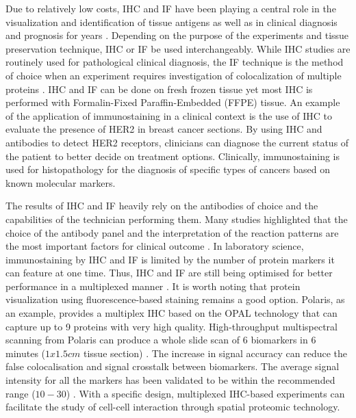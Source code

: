 Due to relatively low costs, IHC and IF have been playing a central role in the visualization and identification of tissue antigens as well as in clinical diagnosis and prognosis for years \cite{ducheyne2015comprehensive, rupprecht2015current}. Depending on the purpose of the experiments and tissue preservation technique, IHC or IF be used interchangeably. While IHC studies are routinely used for pathological clinical diagnosis, the IF technique is the method of choice when an experiment requires investigation of colocalization of multiple proteins \cite{joshi2017immunofluorescence}. IHC and IF can be done on fresh frozen tissue yet most IHC is performed with Formalin-Fixed Paraffin-Embedded (FFPE) tissue. An example of the application of immunostaining in a clinical context is the use of IHC to evaluate the presence of HER2 in breast cancer sections. By using IHC and antibodies to detect HER2 receptors, clinicians can diagnose the current status of the patient to better decide on treatment options. Clinically, immunostaining is used for histopathology for the diagnosis of specific types of cancers based on known molecular markers.  

The results of IHC and IF heavily rely on the antibodies of choice and the capabilities of the technician performing them. Many studies highlighted that the choice of the antibody panel and the interpretation of the reaction patterns are the most important factors for  clinical outcome \cite{de2010immunohistochemistry, jensen1997immunohistochemistry}. In laboratory science, immunostaining by IHC and IF is limited by the number of protein markers it can feature at one time. Thus, IHC and IF are still being optimised for better performance in a multiplexed manner \cite{joshi2017immunofluorescence}. It is worth noting that protein visualization using fluorescence-based staining remains a good option. Polaris, as an example, provides a multiplex IHC based on the OPAL technology that can capture up to 9 proteins with very high quality. High-throughput multispectral scanning from Polaris can produce a whole slide scan of 6 biomarkers in 6 minutes ($1x1.5cm$ tissue section) \cite{hoyt2021multiplex, baharlou2019mass,marc201934th}. The increase in signal accuracy can reduce the false colocalisation and signal crosstalk between biomarkers. The average signal intensity for all the markers has been validated to be within the recommended range ($10-30$) \cite{donovan2021924}. With a specific design, multiplexed IHC-based experiments can facilitate the study of cell-cell interaction through spatial proteomic technology.  


